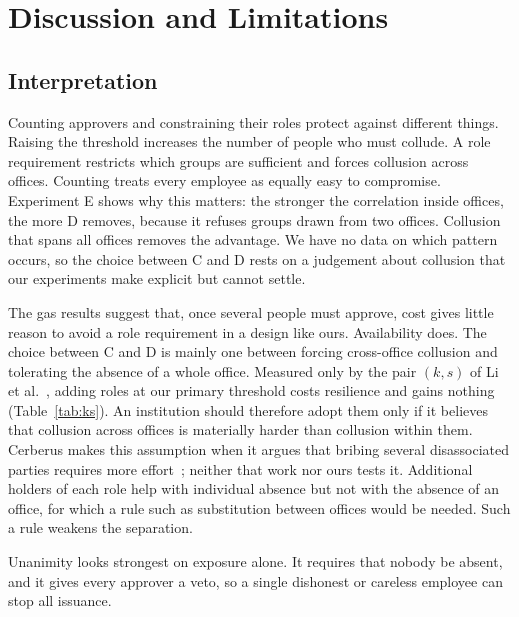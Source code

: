 \section{Discussion and Limitations}\label{sec:discussion}

\subsection{Interpretation}
Counting approvers and constraining their roles protect against different things. Raising the threshold increases the number of people who must collude. A role requirement restricts which groups are sufficient and forces collusion across offices. Counting treats every employee as equally easy to compromise. Experiment E shows why this matters: the stronger the correlation inside offices, the more D removes, because it refuses groups drawn from two offices. Collusion that spans all offices removes the advantage. We have no data on which pattern occurs, so the choice between C and D rests on a judgement about collusion that our experiments make explicit but cannot settle.

The gas results suggest that, once several people must approve, cost gives little reason to avoid a role requirement in a design like ours. Availability does. The choice between C and D is mainly one between forcing cross-office collusion and tolerating the absence of a whole office. Measured only by the pair $(k,s)$ of Li et al.~\cite{li2009}, adding roles at our primary threshold costs resilience and gains nothing (Table~\ref{tab:ks}). An institution should therefore adopt them only if it believes that collusion across offices is materially harder than collusion within them. Cerberus makes this assumption when it argues that bribing several disassociated parties requires more effort~\cite{tariq2023}; neither that work nor ours tests it. Additional holders of each role help with individual absence but not with the absence of an office, for which a rule such as substitution between offices would be needed. Such a rule weakens the separation.

Unanimity looks strongest on exposure alone. It requires that nobody be absent, and it gives every approver a veto, so a single dishonest or careless employee can stop all issuance.

